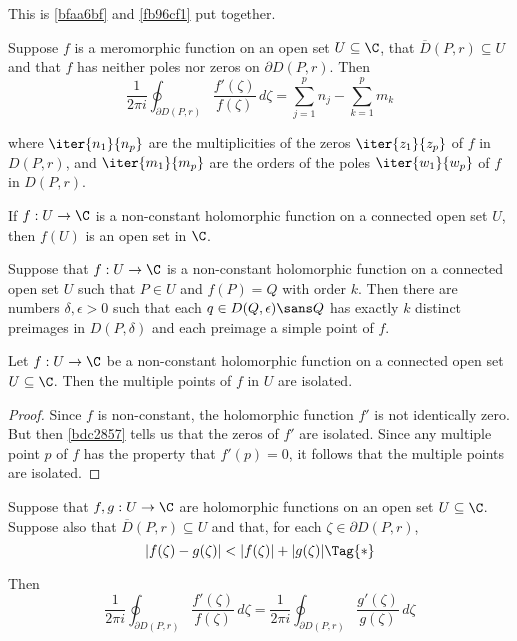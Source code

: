 \label{b8c772b}

This is \autoref{bfaa6bf} and \autoref{fb96cf1} put together.

Suppose $f$ is a meromorphic function on an open set $U\subseteq\C$, that
$\overline D(P,r)\subseteq U$ and that $f$ has neither poles nor zeros on
$\partial D(P,r)$. Then
$$
  \frac1{2\pi i}\oint_{\partial D(P,r)}\frac{f'(\zeta)}{f(\zeta)}\,d\zeta=
  \sum_{j=1}^pn_j-\sum_{k=1}^pm_k
$$

where $\iter{n_1}{n_p}$ are the multiplicities of the zeros $\iter{z_1}{z_p}$
of $f$ in $D(P,r)$, and $\iter{m_1}{m_p}$ are the orders of the poles
$\iter{w_1}{w_p}$ of $f$ in $D(P,r)$.

\label{e5ecb18}

If $f:U\to\C$ is a non-constant holomorphic function on a connected open set
$U$, then $f(U)$ is an open set in $\C$.

\Theorem{}\label{a98fb27}

Suppose that $f:U\to\C$ is a non-constant holomorphic function on a connected
open set $U$ such that $P\in U$ and $f(P)=Q$ with order $k$. Then there are
numbers $\delta,\epsilon>0$ such that each $q\in D(Q,\epsilon)\sans Q$ has
exactly $k$ distinct preimages in $D(P,\delta)$ and each preimage a simple
point of $f$.

\Lemma{}\label{ab74e2a}

Let $f:U\to\C$ be a non-constant holomorphic function on a connected open set
$U\subseteq\C$. Then the multiple points of $f$ in $U$ are isolated.

\begin{proof}
  Since $f$ is non-constant, the holomorphic function $f'$ is not identically
  zero. But then \autoref{bdc2857} tells us that the zeros of $f'$
  are isolated. Since any multiple point $p$ of $f$ has the property that
  $f'(p)=0$, it follows that the multiple points are isolated.
\end{proof}

\label{bf9c04f}

Suppose that $f,g:U\to\C$ are holomorphic functions on an open set
$U\subseteq\C$. Suppose also that $\overline D(P,r)\subseteq U$ and that, for
each $\zeta\in\partial D(P,r)$,
\begin{equation*}
  |f(\zeta)-g(\zeta)|<|f(\zeta)|+|g(\zeta)|\Tag{*}
\end{equation*}

Then
$$
  \frac1{2\pi i}\oint_{\partial D(P,r)}\frac{f'(\zeta)}{f(\zeta)}\,d\zeta
  =\frac1{2\pi i}\oint_{\partial D(P,r)}\frac{g'(\zeta)}{g(\zeta)}\,d\zeta
$$

